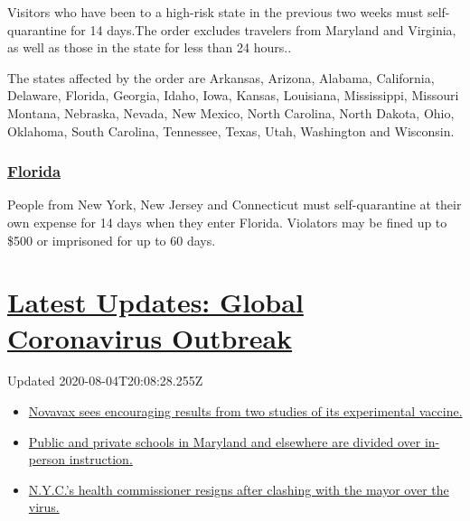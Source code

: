 Visitors who have been to a high-risk state in the previous two weeks
must self-quarantine for 14 days.The order excludes travelers from
Maryland and Virginia, as well as those in the state for less than 24
hours..

The states affected by the order are Arkansas, Arizona, Alabama,
California, Delaware, Florida, Georgia, Idaho, Iowa, Kansas, Louisiana,
Mississippi, Missouri Montana, Nebraska, Nevada, New Mexico, North
Carolina, North Dakota, Ohio, Oklahoma, South Carolina, Tennessee,
Texas, Utah, Washington and Wisconsin.

\hypertarget{florida}{%
\subsubsection{\texorpdfstring{\href{https://floridahealthcovid19.gov/travelers/}{Florida}}{Florida}}\label{florida}}

People from New York, New Jersey and Connecticut must self-quarantine at
their own expense for 14 days when they enter Florida. Violators may be
fined up to \$500 or imprisoned for up to 60 days.

\hypertarget{latest-updates-global-coronavirus-outbreak}{%
\section{\texorpdfstring{\href{https://www.nytimes.com/2020/08/04/world/coronavirus-cases.html?action=click\&pgtype=Article\&state=default\&region=MAIN_CONTENT_1\&context=storylines_live_updates}{Latest
Updates: Global Coronavirus
Outbreak}}{Latest Updates: Global Coronavirus Outbreak}}\label{latest-updates-global-coronavirus-outbreak}}

Updated 2020-08-04T20:08:28.255Z

\begin{itemize}
\tightlist
\item
  \href{https://www.nytimes.com/2020/08/04/world/coronavirus-cases.html?action=click\&pgtype=Article\&state=default\&region=MAIN_CONTENT_1\&context=storylines_live_updates\#link-1228a480}{Novavax
  sees encouraging results from two studies of its experimental
  vaccine.}
\item
  \href{https://www.nytimes.com/2020/08/04/world/coronavirus-cases.html?action=click\&pgtype=Article\&state=default\&region=MAIN_CONTENT_1\&context=storylines_live_updates\#link-4825b93}{Public
  and private schools in Maryland and elsewhere are divided over
  in-person instruction.}
\item
  \href{https://www.nytimes.com/2020/08/04/world/coronavirus-cases.html?action=click\&pgtype=Article\&state=default\&region=MAIN_CONTENT_1\&context=storylines_live_updates\#link-4d1eafa8}{N.Y.C.'s
  health commissioner resigns after clashing with the mayor over the
  virus.}
\end{itemize}

